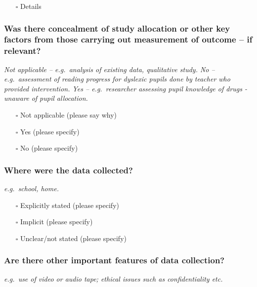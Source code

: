\documentclass[
  doc, a4paper]{apa7}
\providecommand{\tightlist}{%
  \setlength{\itemsep}{0pt}\setlength{\parskip}{0pt}}
\begin{document}
\begin{itemize}
\tightlist
\item[$\square$]
  Details
\end{itemize}

\subsubsection{Was there concealment of study allocation or other key factors from those carrying out measurement of outcome -- if relevant?}\label{was-there-concealment-of-study-allocation-or-other-key-factors-from-those-carrying-out-measurement-of-outcome-if-relevant}

\emph{Not applicable -- e.g.~analysis of existing data, qualitative study. No -- e.g.~assessment of reading progress for dyslexic pupils done by teacher who provided intervention. Yes -- e.g.~researcher assessing pupil knowledge of drugs - unaware of pupil allocation.}

\begin{itemize}
\tightlist
\item[$\square$]
  Not applicable (please say why)
\item[$\square$]
  Yes (please specify)
\item[$\square$]
  No (please specify)
\end{itemize}

\subsubsection{Where were the data collected?}\label{where-were-the-data-collected}

\emph{e.g.~school, home.}

\begin{itemize}
\tightlist
\item[$\square$]
  Explicitly stated (please specify)
\item[$\square$]
  Implicit (please specify)
\item[$\square$]
  Unclear/not stated (please specify)
\end{itemize}

\subsubsection{Are there other important features of data collection?}\label{are-there-other-important-features-of-data-collection}

\emph{e.g.~use of video or audio tape; ethical issues such as confidentiality etc.}
\end{document}
